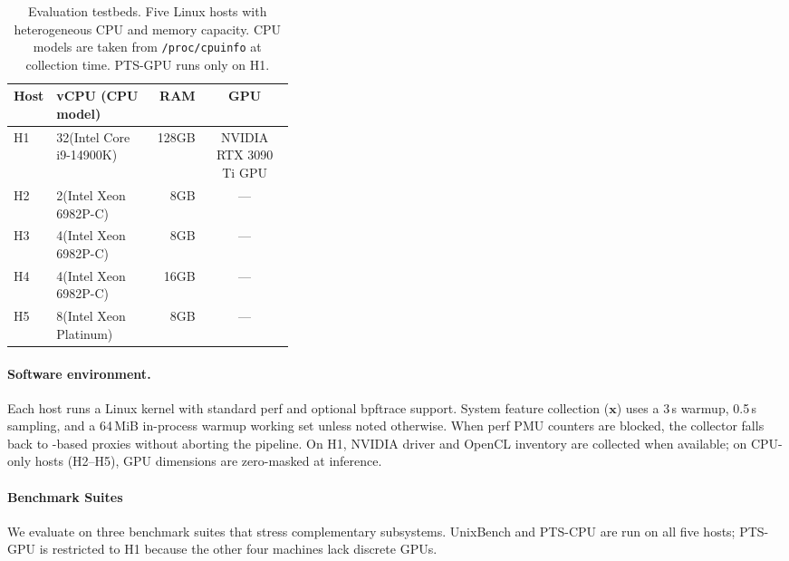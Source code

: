 \documentclass[sigplan,10pt]{acmart}
\newcommand{\ptscpu}{PTS-CPU}
\newcommand{\ptsgpu}{PTS-GPU}
\begin{document}
\begin{table}[t]
\centering
\caption{Evaluation testbeds. Five Linux hosts with heterogeneous CPU and memory capacity. CPU models are taken from \texttt{/proc/cpuinfo} at collection time. \ptsgpu{} runs only on H1.}
\label{tab:testbeds}
\small
\setlength{\tabcolsep}{2pt}
\begin{tabular}{@{}lp{0.36\linewidth}rc@{}}
\toprule
\textbf{Host} & \textbf{vCPU (CPU model)} & \textbf{RAM} & \textbf{GPU} \\
\midrule
H1 & 32(Intel Core i9-14900K) & 128GB & NVIDIA RTX 3090 Ti GPU \\
H2 & 2(Intel Xeon 6982P-C) & 8GB & --- \\
H3 & 4(Intel Xeon 6982P-C) & 8GB & --- \\
H4 & 4(Intel Xeon 6982P-C) & 16GB & --- \\
H5 & 8(Intel Xeon Platinum) & 8GB & --- \\
\bottomrule
\end{tabular}
\end{table}


\paragraph{Software environment.}
Each host runs a Linux kernel with standard perf and optional bpftrace support.
System feature collection (\(\mathbf{x}\)) uses a 3\,s warmup, 0.5\,s  sampling, and a 64\,MiB in-process warmup working set unless noted otherwise.
When perf PMU counters are blocked, the collector falls back to -based proxies without aborting the pipeline.
On H1, NVIDIA driver and OpenCL inventory are collected when available; on CPU-only hosts (H2--H5), GPU dimensions are zero-masked at inference.



\paragraph{Benchmark Suites}
\label{subsubsec:benchmark-suites}

We evaluate on three benchmark suites that stress complementary subsystems.
UnixBench and \ptscpu{} are run on all five hosts; \ptsgpu{} is restricted to H1 because the other four machines lack discrete GPUs.
\end{document}

